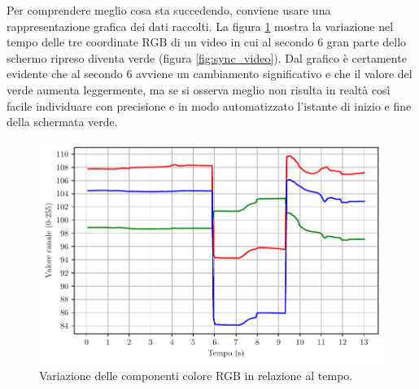 \inputminted[xleftmargin=\parindent,linenos]{python}{res/opencv.py}

Per comprendere meglio cosa sta succedendo, conviene usare una rappresentazione grafica dei dati raccolti. La figura \ref{fig:sync_opencv1} mostra la variazione nel tempo delle tre coordinate RGB di un video in cui al secondo 6 gran parte dello schermo ripreso diventa verde (figura \ref{fig:sync_video}). Dal grafico è certamente evidente che al secondo 6 avviene un cambiamento significativo e che il valore del verde aumenta leggermente, ma se si osserva meglio non risulta in realtà così facile individuare con precisione e in modo automatizzato l'istante di inizio e fine della schermata verde.

\begin{figure}[htbp]
	\centering
	
	\includegraphics{res/opencv_channels_tight.pdf}
	
	\caption{Variazione delle componenti colore RGB in relazione al tempo.}
	\label{fig:sync_opencv1}
\end{figure}

